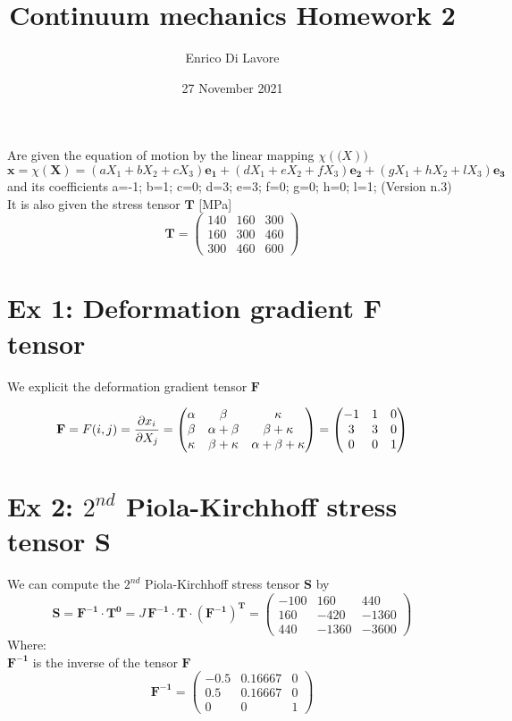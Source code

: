 \documentclass[a4paper,11pt]{article}
\begin{document}
\title{Continuum mechanics Homework 2}
\author{Enrico Di Lavore}
\date{27 November 2021}
\maketitle

Are given the equation of motion by the linear mapping $\chi (\mathbf(X))$
\[ \mathbf{x}=\chi(\mathbf{X})=(a X_1+b X_2+ c X_3) \mathbf{e_1}+
(d X_1+e X_2+ f X_3) \mathbf{e_2}+
(gX_1+h X_2+ l X_3) \mathbf{e_3}  \]
and its coefficients a=-1; b=1; c=0; d=3; e=3; f=0; g=0; h=0; l=1; (Version n.3)\\
It is also given the stress tensor $\mathbf{T}$ [MPa]
\[\mathbf{T}= \begin{pmatrix}
   140 &  160 &  300\\
   160  & 300 &  460\\
   300  & 460  & 600 \end{pmatrix} \]

	\section{Ex 1: Deformation gradient \textbf{F} tensor}
We explicit the deformation gradient tensor  $\mathbf{F}$ 

\[ \mathbf{F}=F(i,j)=\pdv{x_i}{X_j}= \begin{pmatrix}
\alpha    &  \beta          &     \kappa \\
 \beta    &  \alpha+\beta    &  \beta+\kappa \\
 \kappa  &   \beta+\kappa  & \alpha+\beta+\kappa \end{pmatrix}= \begin{pmatrix}
    -1 &    1  &   0\\
     3  &   3   &  0\\
     0  &   0    & 1 \end{pmatrix}\]
     
     \section{Ex 2: $2^{nd}$ Piola-Kirchhoff stress tensor $\mathbf{S}$}
We can compute the $2^{nd}$ Piola-Kirchhoff stress tensor $\mathbf{S}$ by
\[ \mathbf{S}= \mathbf{F^{-1}} \cdot \mathbf{T^0}=J \, \mathbf{F^{-1}} \cdot \mathbf{T} \cdot \mathbf{(F^{-1})^T}= \begin{pmatrix}
        -100   &      160    &     440\\
         160    &    -420    &   -1360\\
         440    &  -1360    &   -3600\end{pmatrix}\]
Where: \\
$\mathbf{F^{-1}}$ is the inverse of the tensor $\mathbf{F}$
\[ \mathbf{F^{-1}}= \begin{pmatrix}
         -0.5    &  0.16667       &     0\\
          0.5     & 0.16667        &    0\\
            0      &      0          &  1  \end{pmatrix}\]
\end{document}
